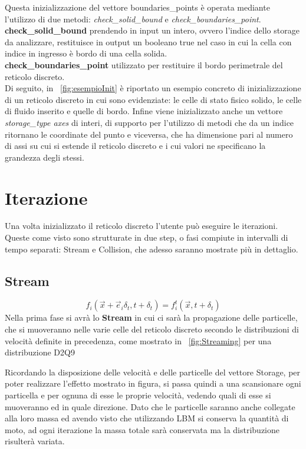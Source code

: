 {Questa inizializzazione del vettore boundaries\_points \`e operata mediante l'utilizzo di due metodi: \textit{check\_solid\_bound} e \textit{check\_boundaries\_point}.\\
\textbf{check\_solid\_bound} prendendo in input un intero, ovvero l'indice dello storage da analizzare, restituisce in output un booleano true nel caso in cui la cella con indice in ingresso \`e bordo di una cella solida.\\
\textbf{check\_boundaries\_point} utilizzato per restituire il bordo perimetrale del reticolo discreto.\\
Di seguito, in \figurename~\ref{fig:esempioInit}  \`e riportato un esempio concreto di inizializzazione di un reticolo discreto in cui sono evidenziate: le celle di stato fisico solido, le celle di fluido inserito e quelle di bordo. Infine viene inizializzato anche un vettore \textit{storage\_type axes} di interi, di supporto per l'utilizzo di metodi che da un indice ritornano le coordinate del punto e viceversa, che ha dimensione pari al numero di assi su cui si estende il reticolo discreto e i cui valori ne specificano la grandezza degli stessi.


\section{Iterazione}
Una volta inizializzato il reticolo discreto l'utente pu\`o eseguire le iterazioni. Queste come visto sono strutturate in due step, o fasi compiute in intervalli di tempo separati: Stream e Collision, che adesso saranno mostrate pi\`u in dettaglio.
\subsection{Stream}
$$f_{i}({\vec {x}}+{\vec {e}}_{i}\delta _{t},t+\delta _{t})=f_{i}^{t}({\vec {x}},t+\delta _{t}) $$
Nella prima fase si avr\`a lo \textbf{Stream} in cui ci sar\`a la propagazione delle particelle, che si muoveranno nelle varie celle del reticolo discreto secondo le distribuzioni di velocit\`a definite in precedenza, come mostrato in \figurename~\ref{fig:Streaming} per una distribuzione D2Q9%


Ricordando la disposizione delle velocit\`a e delle particelle del vettore Storage, per poter realizzare l'effetto mostrato in figura, si passa quindi a una scansionare ogni particella e per ognuna di esse le proprie velocit\`a, vedendo quali di esse si muoveranno ed in quale direzione. Dato che le particelle saranno anche collegate alla loro massa ed avendo visto che utilizzando LBM si conserva la quantit\`a di moto, ad ogni iterazione la massa totale sar\`a conservata ma la distribuzione risulter\`a variata.
}
